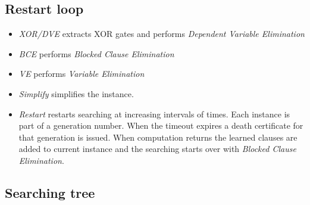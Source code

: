\subsection{Restart loop}

\begin{itemize}
  \item \emph{XOR/DVE} extracts XOR gates and performs \emph{Dependent
  Variable Elimination}

  \item \emph{BCE} performs \emph{Blocked Clause Elimination}

  \item \emph{VE} performs \emph{Variable Elimination}

  \item \emph{Simplify} simplifies the instance.

  \item \emph{Restart} restarts searching at increasing intervals of times.
  Each instance is part of a generation number. When the timeout expires
  a death certificate for that generation is issued. When computation returns
  the learned clauses are added to current instance and the searching starts
  over with \emph{Blocked Clause Elimination}.

\end{itemize}


\subsection{Searching tree}

